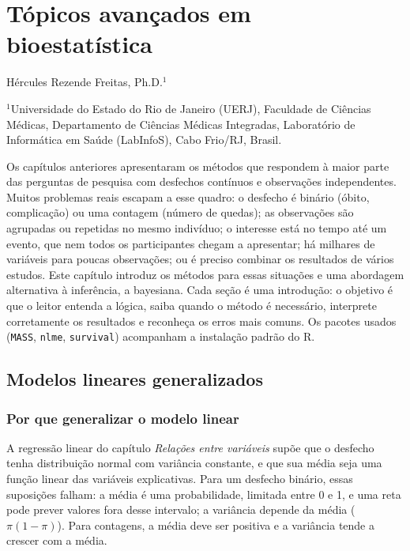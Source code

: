 \documentclass[
]{book}
\begin{document}
\chapter{Tópicos avançados em bioestatística}\label{tuxf3picos-avanuxe7ados-em-bioestatuxedstica}

Hércules Rezende Freitas, Ph.D.\(^1\)

\(^1\)Universidade do Estado do Rio de Janeiro (UERJ), Faculdade de Ciências Médicas, Departamento de Ciências Médicas Integradas, Laboratório de Informática em Saúde (LabInfoS), Cabo Frio/RJ, Brasil.

Os capítulos anteriores apresentaram os métodos que respondem à maior parte das perguntas de pesquisa com desfechos contínuos e observações independentes. Muitos problemas reais escapam a esse quadro: o desfecho é binário (óbito, complicação) ou uma contagem (número de quedas); as observações são agrupadas ou repetidas no mesmo indivíduo; o interesse está no tempo até um evento, que nem todos os participantes chegam a apresentar; há milhares de variáveis para poucas observações; ou é preciso combinar os resultados de vários estudos. Este capítulo introduz os métodos para essas situações e uma abordagem alternativa à inferência, a bayesiana. Cada seção é uma introdução: o objetivo é que o leitor entenda a lógica, saiba quando o método é necessário, interprete corretamente os resultados e reconheça os erros mais comuns. Os pacotes usados (\texttt{MASS}, \texttt{nlme}, \texttt{survival}) acompanham a instalação padrão do R.

\section{Modelos lineares generalizados}\label{modelos-lineares-generalizados}

\subsection{Por que generalizar o modelo linear}\label{por-que-generalizar-o-modelo-linear}

A regressão linear do capítulo \emph{Relações entre variáveis} supõe que o desfecho tenha distribuição normal com variância constante, e que sua média seja uma função linear das variáveis explicativas. Para um desfecho binário, essas suposições falham: a média é uma probabilidade, limitada entre 0 e 1, e uma reta pode prever valores fora desse intervalo; a variância depende da média (\(\pi(1 - \pi)\)). Para contagens, a média deve ser positiva e a variância tende a crescer com a média.
\end{document}
